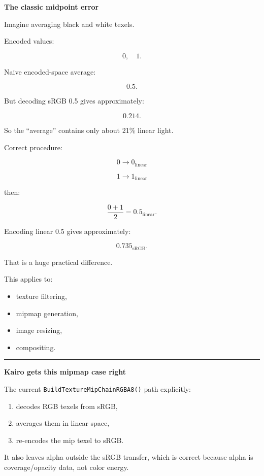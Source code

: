 \textbf{The classic midpoint error}

Imagine averaging black and white texels.

Encoded values:

\[
0,\quad1.
\]

Naive encoded-space average:

\[
0.5.
\]

But decoding sRGB 0.5 gives approximately:

\[
0.214.
\]

So the ``average'' contains only about 21\% linear light.

Correct procedure:

\[
0\rightarrow0_{\text{linear}}
\]

\[
1\rightarrow1_{\text{linear}}
\]

then:

\[
\frac{0+1}{2}=0.5_{\text{linear}}.
\]

Encoding linear 0.5 gives approximately:

\[
\boxed{0.735_{\text{sRGB}}}.
\]

That is a huge practical difference.

This applies to:

\begin{itemize}
\tightlist
\item
  texture filtering,
\item
  mipmap generation,
\item
  image resizing,
\item
  compositing.
\end{itemize}

\begin{center}\rule{0.5\linewidth}{0.5pt}\end{center}

\textbf{Kairo gets this mipmap case right}

The current \texttt{BuildTextureMipChainRGBA8()} path explicitly:

\begin{enumerate}
\def\labelenumi{\arabic{enumi}.}
\tightlist
\item
  decodes RGB texels from sRGB,
\item
  averages them in linear space,
\item
  re-encodes the mip texel to sRGB.
\end{enumerate}

It also leaves alpha outside the sRGB transfer, which is correct because alpha is coverage/opacity data, not color energy.

